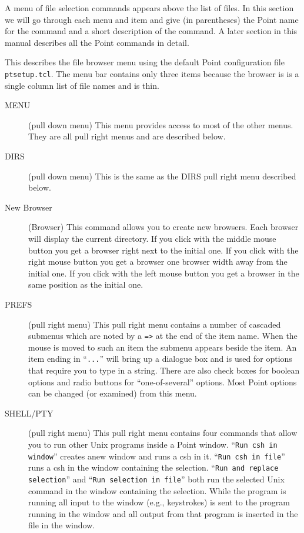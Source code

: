 A menu of file selection commands appears above the list of files.
In this section we will go through each menu and item and
give (in parentheses) the Point name
for the command and a short description of the command.
A later section in this manual describes all the Point commands in detail.

This describes the file browser menu using the default Point
configuration file {\tt ptsetup.tcl}.
The menu bar contains only three items because the browser is
is a single column list of file names and is thin.

\begin{description}

\item[MENU] (pull down menu)
This menu provides access to most of the other menus.
They are all pull right menus and are described below.

\item[DIRS] (pull down menu)
This is the same as the DIRS pull right menu described below.

\item[New Browser] (Browser)
This command allows you to create new browsers.
Each browser will display the current directory.
If you click with the middle mouse button you get a browser right
next to the initial one.
If you click with the right mouse button you get a browser one browser
width away from the initial one.
If you click with the left mouse button you get a browser in the same
position as the initial one.


\item[PREFS] (pull right menu)
This pull right menu contains a number of cascaded submenus which are
noted by a {\tt =>} at the end of the item name.
When the mouse is moved to such an item the submenu appears beside
the item.
An item ending in ``{\tt ...}'' will bring up a dialogue box
and is used for options that require you to type in a string.
There are also check boxes for boolean options and radio buttons
for ``one-of-several'' options.
Most Point options can be changed (or examined) from this menu.

\item[SHELL/PTY] (pull right menu)
This pull right menu contains four commands that allow you to
run other Unix programs inside a Point window.
``{\tt Run csh in window}'' creates anew window and runs a csh in it.
``{\tt Run csh in file}'' runs a csh in the window containing the selection.
``{\tt Run and replace selection}'' and ``{\tt Run selection in file}''
both run the selected Unix command in the window containing the
selection.
While the program is running all input to the window (e.g., keystrokes)
is sent to the program running in the window and all output from
that program is inserted in the file in the window.


\end{description}
